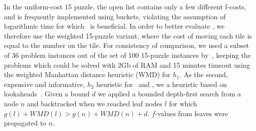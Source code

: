 In the uniform-cost 15 puzzle, the open list contains only a few
different f-costs, and is frequently implemented using buckets,
violating the assumption of logarithmic time for which \rationallazyastar~is
beneficial. In order to better evaluate \rationallazyastar, we therefore use
the weighted 15-puzzle variant, where the cost of moving each tile is
equal to the number on the tile.  For consistency of comparison, we
used a subset of 36 problem instances out of the set of 100 15-puzzle
instances by~\cite{BFID85}, keeping the problems which could be solved
with 2Gb of RAM and 15 minutes timeout using the weighted Manhattan
distance heuristic (WMD) for $h_1$. As the second, expensive and informative,
$h_2$ heuristic for \lazyastar~and \rationallazyastar, we a heuristic
based on lookaheads~\cite{DBLP:conf/aaai/SternKFH10}. Given a bound
$d$ we applied a bounded depth-first search from a node $n$ and
backtracked when we reached leaf nodes $l$ for which $g(l)+WMD(l)>
g(n)+WMD(n)+d$. $f$-values from leaves were propagated to $n$.

